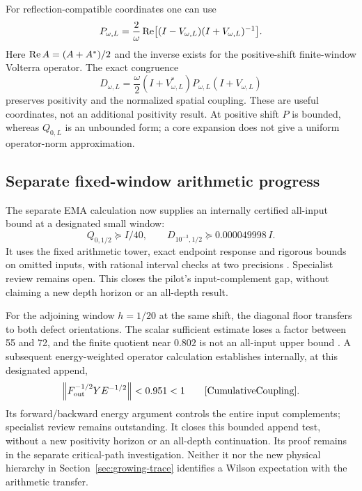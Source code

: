 For reflection-compatible coordinates one can use
\[
 P_{\omega,L}=\frac2\omega\operatorname{Re}\bigl[(I-V_{\omega,L})
                                    (I+V_{\omega,L})^{-1}\bigr].
\]
Here $\operatorname{Re} A=(A+A^*)/2$ and the inverse exists for the
positive-shift finite-window Volterra operator.
The exact congruence
\begin{equation}
 D_{\omega,L}=\frac\omega2(I+V_{\omega,L}^*)P_{\omega,L}
                                      (I+V_{\omega,L})
\end{equation}
preserves positivity and the normalized spatial coupling.
These are useful coordinates, not an additional positivity result.
At positive shift $P$ is bounded, whereas $Q_{0,L}$ is an unbounded
form; a core expansion does not give a uniform operator-norm
approximation.

\subsection{Separate fixed-window arithmetic progress}

The separate EMA calculation now supplies an internally certified
all-input bound at a designated small window:
\begin{equation}\label{eq:main-ema-anchor}
 Q_{0,1/2}\succeq I/40,\qquad
 D_{10^{-3},1/2}\succeq0.000049998\,I.
\end{equation}
It uses the fixed arithmetic tower, exact endpoint response and
rigorous bounds on omitted inputs, with rational interval checks
at two precisions \cite{EMAAnchor}. Specialist review remains open.
This closes the pilot's input-complement gap, without claiming a
new depth horizon or an all-depth result.

For the adjoining window $h=1/20$ at the same shift, the diagonal
floor transfers to both defect orientations. The scalar sufficient
estimate loses a factor between 55 and 72, and the finite quotient
near $0.802$ is not an all-input upper bound \cite{CumulativeAppend}.
A subsequent energy-weighted operator calculation establishes
internally, at this designated append,
\[
 \left\lVert F_{\mathrm{out}}^{-1/2}YE^{-1/2}\right\rVert<0.951<1
 \qquad\cite{CumulativeCoupling}.
\]
Its forward/backward energy argument controls the entire input
complements; specialist review remains outstanding. It closes
this bounded append test, without a new positivity horizon or an
all-depth continuation. Its proof remains in the separate
critical-path investigation. Neither it nor the new physical
hierarchy in Section~\ref{sec:growing-trace} identifies a Wilson
expectation with the arithmetic transfer.

